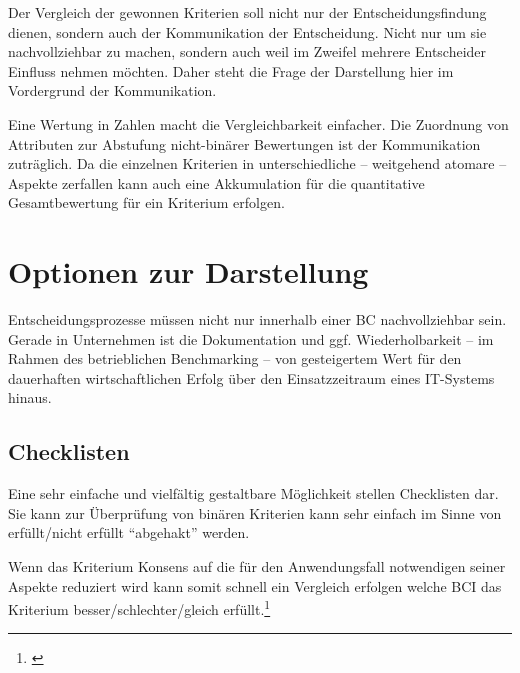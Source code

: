 

Der Vergleich der gewonnen Kriterien soll nicht nur der Entscheidungsfindung dienen, sondern auch der Kommunikation der Entscheidung.
Nicht nur um sie nachvollziehbar zu machen, sondern auch weil im Zweifel mehrere Entscheider Einfluss nehmen möchten.
Daher steht die Frage der Darstellung hier im Vordergrund der Kommunikation.

Eine Wertung in Zahlen macht die Vergleichbarkeit einfacher.
Die Zuordnung von Attributen zur Abstufung nicht-binärer Bewertungen ist der Kommunikation zuträglich.
Da die einzelnen Kriterien in unterschiedliche -- weitgehend atomare -- Aspekte zerfallen kann auch eine Akkumulation für die quantitative Gesamtbewertung für ein Kriterium erfolgen.


\section{Optionen zur Darstellung}\label{depiction}

Entscheidungsprozesse müssen nicht nur innerhalb einer \gls{BC} nachvollziehbar sein.
Gerade in Unternehmen ist die Dokumentation und ggf. Wiederholbarkeit -- \zB{} im Rahmen des betrieblichen Benchmarking -- von gesteigertem Wert für den dauerhaften wirtschaftlichen Erfolg über den Einsatzzeitraum eines IT-Systems hinaus.

\subsection{Checklisten}

Eine sehr einfache und vielfältig gestaltbare Möglichkeit stellen Checklisten dar.
Sie kann zur Überprüfung von binären Kriterien kann sehr einfach im Sinne von erfüllt/nicht erfüllt \enquote{abgehakt} werden.

Wenn das Kriterium Konsens auf die für den Anwendungsfall notwendigen seiner Aspekte reduziert wird kann somit schnell ein Vergleich erfolgen welche \gls{BCI} das Kriterium besser/schlechter/gleich erfüllt.\footnote{\cite{TN_libero_mab215408815}}

